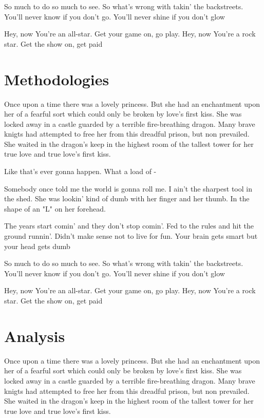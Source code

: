 \documentclass{article}
\begin{document}
So much to do so much to see. So what's wrong with takin' the backstreets.  You'll never know if you don't go.  You'll never shine if you don't glow 

Hey, now You're an all-star.  Get your game on, go play.  Hey, now You're a rock star.  Get the show on, get paid

\section{Methodologies}

Once upon a time there was a lovely princess.  But she had an enchantment upon her of a fearful sort which could only be broken by love's first kiss.  She was locked away in a castle guarded by a terrible fire-breathing dragon.  Many brave knigts had attempted to free her from this dreadful prison, but non prevailed.  She waited in the dragon's keep in the highest room of the tallest tower for her true love and true love's first kiss.

Like that's ever gonna happen.  What a load of - 

Somebody once told me the world is gonna roll me. I ain't the sharpest tool in the shed. She was lookin' kind of dumb with her finger and her thumb.  In the shape of an "L" on her forehead.

The years start comin' and they don't stop comin'. Fed to the rules and hit the ground runnin'.  Didn't make sense not to live for fun.  Your brain gets smart but your head gets dumb

So much to do so much to see. So what's wrong with takin' the backstreets.  You'll never know if you don't go.  You'll never shine if you don't glow 

Hey, now You're an all-star.  Get your game on, go play.  Hey, now You're a rock star.  Get the show on, get paid

\section{Analysis}

Once upon a time there was a lovely princess.  But she had an enchantment upon her of a fearful sort which could only be broken by love's first kiss.  She was locked away in a castle guarded by a terrible fire-breathing dragon.  Many brave knigts had attempted to free her from this dreadful prison, but non prevailed.  She waited in the dragon's keep in the highest room of the tallest tower for her true love and true love's first kiss.
\end{document}
